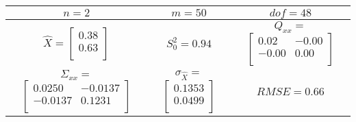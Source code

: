 \begin{table}[H]
\centering
\begin{tabular}{|c|c|c|}
\toprule
$n = 2$& %
$m = 50$& %
$dof = 48$\\ %
\midrule
$\hat{X} = $$
 \begin{bmatrix}
0.38\\
0.63\\
\end{bmatrix}
$
& %
$S_0^2 = 0.94$ & %
$Q_{xx} = $ $
 \begin{bmatrix}
0.02&-0.00\\
-0.00&0.00\\
\end{bmatrix}
$
\\ %
\midrule
$\Sigma_{xx} = $ $
 \begin{bmatrix}
0.0250&-0.0137\\
-0.0137&0.1231\\
\end{bmatrix}
$
& %
$\sigma_{\hat{X}} = $ $
 \begin{bmatrix}
0.1353\\
0.0499\\
\end{bmatrix}
$
& %
$RMSE = 0.66$\\ %
\bottomrule
\end{tabular}
\end{table}
